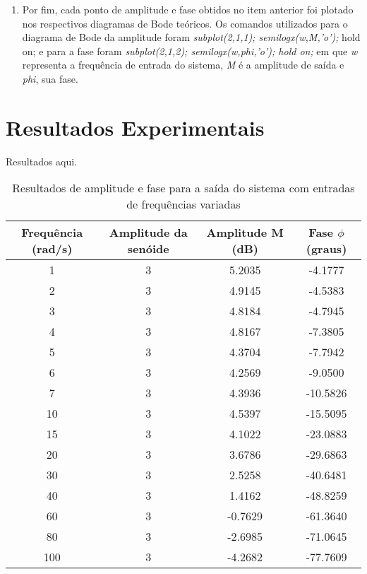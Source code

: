 \documentclass[a4paper,12pt]{article}
\begin{document}
\begin{enumerate}
\item Por fim, cada ponto de amplitude e fase obtidos no item anterior foi plotado nos respectivos diagramas de Bode teóricos. Os comandos utilizados para o diagrama de Bode da amplitude foram \textit{subplot(2,1,1); semilogx(w,M,’o’);} hold on; e para a fase foram \textit{subplot(2,1,2);
semilogx(w,phi,’o’); hold on;} em que \textit{w} representa a frequência de entrada do sistema, \textit{M} é a amplitude de saída e \textit{phi}, sua fase.

\end{enumerate}

\section{Resultados Experimentais}

Resultados aqui.

\begin{table}[H]
    \centering
    \begin{tabular}{|c|c|c|c|}
        \hline
        Frequência (rad/s) & Amplitude da senóide & Amplitude M (dB) & Fase $\phi$ (graus)\\
        \hline
        1 & 3 & 5.2035 & -4.1777 \\
        \hline
        2 & 3 & 4.9145 & -4.5383 \\
        \hline
        3 & 3 & 4.8184 & -4.7945 \\
        \hline
        4 & 3 & 4.8167 & -7.3805 \\
        \hline
        5 & 3 & 4.3704 & -7.7942 \\
        \hline
        6 & 3 & 4.2569 & -9.0500 \\
        \hline
        7 & 3 & 4.3936 & -10.5826 \\
        \hline
        10 & 3 & 4.5397 & -15.5095 \\
        \hline
        15 & 3 & 4.1022 & -23.0883 \\
        \hline
        20 & 3 & 3.6786 & -29.6863 \\
        \hline
        30 & 3 & 2.5258 & -40.6481 \\
        \hline
        40 & 3 & 1.4162 & -48.8259 \\
        \hline
        60 & 3 & -0.7629 & -61.3640 \\
        \hline
        80 & 3 & -2.6985 & -71.0645 \\
        \hline
        100 & 3 & -4.2682 & -77.7609 \\
        \hline
    \end{tabular}
    \caption{Resultados de amplitude e fase para a saída do sistema com entradas de frequências variadas}
    \label{tab:resultados}
\end{table}
\end{document}
